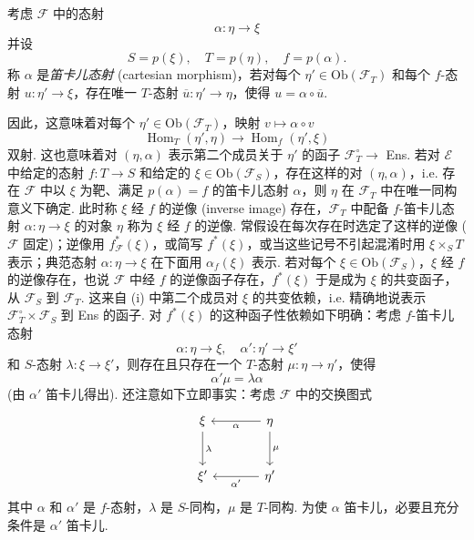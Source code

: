 \begin{definition}\label{def:VI.5.1}
考虑 $\mathcal{F}$ 中的态射
\[
\alpha \colon \eta \longrightarrow \xi
\]
并设
\[
S = p(\xi), \quad T = p(\eta), \quad f = p(\alpha).
\]
称 $\alpha$ 是\emph{笛卡儿态射} (cartesian morphism)，若对每个 $\eta' \in \mathrm{Ob}(\mathcal{F}_T)$ 和每个 $f$-态射 $u \colon \eta' \to \xi$，存在唯一 $T$-态射 $\overline{u} \colon \eta' \to \eta$，使得 $u = \alpha \circ \overline{u}$.

因此，这意味着对每个 $\eta' \in \mathrm{Ob}(\mathcal{F}_T)$，映射 $v \mapsto \alpha \circ v$
\begin{equation}
\operatorname{Hom}_T(\eta', \eta) \longrightarrow \operatorname{Hom}_f(\eta', \xi) \tag{i}
\label{eq:VI.i3}
\end{equation}
双射. 这也意味着对 $(\eta, \alpha)$ 表示第二个成员关于 $\eta'$ 的函子 $\mathcal{F}_T^{\circ} \to$ Ens. 若对 $\mathcal{E}$ 中给定的态射 $f \colon T \to S$ 和给定的 $\xi \in \mathrm{Ob}(\mathcal{F}_S)$，存在这样的对 $(\eta, \alpha)$，i.e. 存在 $\mathcal{F}$ 中以 $\xi$ 为靶、满足 $p(\alpha) = f$ 的笛卡儿态射 $\alpha$，则 $\eta$ 在 $\mathcal{F}_T$ 中在唯一同构意义下确定. 此时称 $\xi$ 经 $f$ 的逆像 (inverse image) 存在，$\mathcal{F}_T$ 中配备 $f$-笛卡儿态射 $\alpha \colon \eta \to \xi$ 的对象 $\eta$ 称为 $\xi$ 经 $f$ 的逆像. 常假设在每次存在时选定了这样的逆像 ($\mathcal{F}$ 固定)；逆像用 $f_{\mathcal{F}}^{*}(\xi)$，或简写 $f^{*}(\xi)$，或当这些记号不引起混淆时用 $\xi \times_S T$ 表示；典范态射 $\alpha \colon \eta \to \xi$ 在下面用 $\alpha_f(\xi)$ 表示. 若对每个 $\xi \in \mathrm{Ob}(\mathcal{F}_S)$，$\xi$ 经 $f$ 的逆像存在，也说 $\mathcal{F}$ 中经 $f$ 的逆像函子存在，$f^{*}(\xi)$ 于是成为 $\xi$ 的共变函子，从 $\mathcal{F}_S$ 到 $\mathcal{F}_T$. 这来自 (i) 中第二个成员对 $\xi$ 的共变依赖，i.e. 精确地说表示 $\mathcal{F}_T^{\circ} \times \mathcal{F}_S$ 到 Ens 的函子. 对 $f^{*}(\xi)$ 的这种函子性依赖如下明确：考虑 $f$-笛卡儿态射
\[
\alpha \colon \eta \longrightarrow \xi, \quad \alpha' \colon \eta' \longrightarrow \xi'
\]
和 $S$-态射 $\lambda \colon \xi \to \xi'$，则存在且只存在一个 $T$-态射 $\mu \colon \eta \to \eta'$，使得
\[
\alpha'\mu = \lambda\alpha
\]
(由 $\alpha'$ 笛卡儿得出). 还注意如下立即事实：考虑 $\mathcal{F}$ 中的交换图式
\[
\begin{tikzcd}[row sep=large, column sep=large]
\xi \arrow[d,"\lambda"] & \eta \arrow[l,"\alpha"] \arrow[d,"\mu"] \\
\xi' & \eta' \arrow[l,"\alpha'"]
\end{tikzcd}
\]
其中 $\alpha$ 和 $\alpha'$ 是 $f$-态射，$\lambda$ 是 $S$-同构，$\mu$ 是 $T$-同构. 为使 $\alpha$ 笛卡儿，必要且充分条件是 $\alpha'$ 笛卡儿.
\end{definition}

